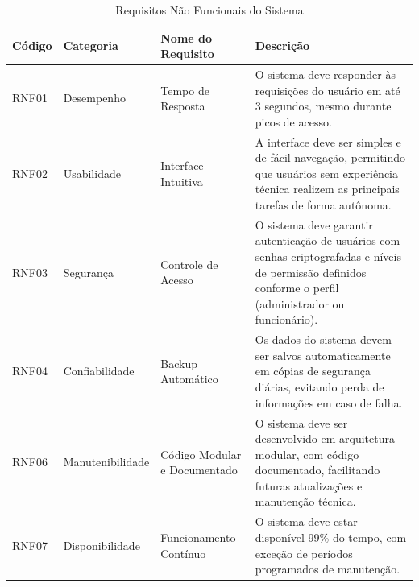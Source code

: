 \begin{table}[H]
\centering
\caption{Requisitos Não Funcionais do Sistema}
\label{tab:requisitos-nao-funcionais}
\begin{tabular}{|p{2cm}|p{3cm}|p{4cm}|p{6.5cm}|}
\hline
\textbf{Código} & \textbf{Categoria} & \textbf{Nome do Requisito} & \textbf{Descrição} \\ \hline

RNF01 & Desempenho & Tempo de Resposta & 
O sistema deve responder às requisições do usuário em até 3 segundos, mesmo durante picos de acesso. \\ \hline

RNF02 & Usabilidade & Interface Intuitiva & 
A interface deve ser simples e de fácil navegação, permitindo que usuários sem experiência técnica realizem as principais tarefas de forma autônoma. \\ \hline

RNF03 & Segurança & Controle de Acesso & 
O sistema deve garantir autenticação de usuários com senhas criptografadas e níveis de permissão definidos conforme o perfil (administrador ou funcionário). \\ \hline

RNF04 & Confiabilidade & Backup Automático & 
Os dados do sistema devem ser salvos automaticamente em cópias de segurança diárias, evitando perda de informações em caso de falha. \\ \hline

RNF06 & Manutenibilidade & Código Modular e Documentado & 
O sistema deve ser desenvolvido em arquitetura modular, com código documentado, facilitando futuras atualizações e manutenção técnica. \\ \hline

RNF07 & Disponibilidade & Funcionamento Contínuo & 
O sistema deve estar disponível 99\% do tempo, com exceção de períodos programados de manutenção. \\ \hline

\end{tabular}
\end{table}

